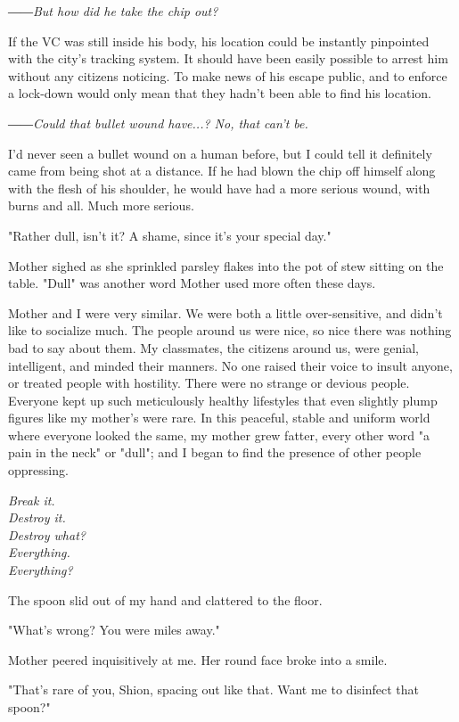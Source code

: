 \emph{――But how did he take the chip out?}

If the VC was still inside his body, his location could be instantly
pinpointed with the city's tracking system. It should have been easily
possible to arrest him without any citizens noticing. To make news of
his escape public, and to enforce a lock-down would only mean that they
hadn't been able to find his location.

\emph{――Could that bullet wound have...? No, that can't be.}

I'd never seen a bullet wound on a human before, but I could tell it
definitely came from being shot at a distance. If he had blown the chip
off himself along with the flesh of his shoulder, he would have had a
more serious wound, with burns and all. Much more serious.

"Rather dull, isn't it? A shame, since it's your special day."

Mother sighed as she sprinkled parsley flakes into the pot of stew
sitting on the table. "Dull" was another word Mother used more often
these days.

Mother and I were very similar. We were both a little over-sensitive,
and didn't like to socialize much. The people around us were nice, so
nice there was nothing bad to say about them. My classmates, the
citizens around us, were genial, intelligent, and minded their manners.
No one raised their voice to insult anyone, or treated people with
hostility. There were no strange or devious people. Everyone kept up
such meticulously healthy lifestyles that even slightly plump figures
like my mother's were rare. In this peaceful, stable and uniform world
where everyone looked the same, my mother grew fatter, every other word
"a pain in the neck" or "dull"; and I began to find the presence of
other people oppressing.

\myspace

\emph{Break it.\\
	Destroy it.\\
	Destroy what?\\
	Everything.\\
	Everything?}

\myspace

The spoon slid out of my hand and clattered to the floor.

"What's wrong? You were miles away."

Mother peered inquisitively at me. Her round face broke into a smile.

"That's rare of you, Shion, spacing out like that. Want me to disinfect
that spoon?"

